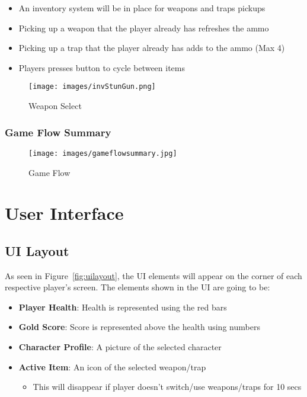 \documentclass[10pt]{report}
\begin{document}
\begin{minipage}{.8\linewidth}
    \begin{itemize}
        \item An inventory system will be in place for weapons and traps pickups
        \item Picking up a weapon that the player already has refreshes the ammo
        \item Picking up a trap that the player already has adds to the ammo (Max 4)
        \item Players presses button to cycle between items    
    \end{itemize}
\end{minipage}\hfill
\begin{minipage}{.18\linewidth}
    \begin{figure}[H]
        \texttt{[image: images/invStunGun.png]}
        \caption{Weapon Select}
    \end{figure}
\end{minipage}

\subsection{Game Flow Summary}

\begin{figure}[H]
    \centering
    \texttt{[image: images/gameflowsummary.jpg]}
    \caption{Game Flow}
\end{figure}


\chapter{User Interface}

\section{UI Layout}

As seen in Figure~\ref{fig:uilayout}, the UI elements will appear on the corner of each respective player's screen. The elements shown in the UI are going to be:

\begin{itemize}
    \item \textbf{Player Health}: Health is represented using the red bars
    \item \textbf{Gold Score}: Score is represented above the health using numbers
    \item \textbf{Character Profile}: A picture of the selected character
    \item \textbf{Active Item}: An icon of the selected weapon/trap 
    \begin{itemize}
        \item This will disappear if player doesn’t switch/use weapons/traps for 10 secs
    \end{itemize}
\end{itemize}
\end{document}
